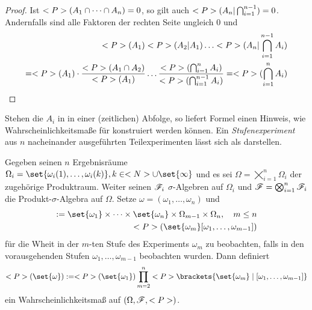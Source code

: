 \begin{proof}
	Ist $<P>(A_1 \cap \dots \cap A_n) = 0$, so gilt auch $<P>(A_n \vert \bigcap_{i=1}^{n-1}) = 0$. Andernfalls sind alle Faktoren der rechten Seite ungleich 0 und
	\begin{align*}
		\probp(A_1)\probp(A_2 \vert A_1) \dots \probp(A_n \vert \bigcap_{i=1}^{n-1} A_i) \\
		= \probp(A_1) \cdot \frac{\probp(A_1 \cap A_2)}{\probp(A_1)} \dots \frac{\probp(\bigcap_{i=1}^{n} A_i)}{\probp(\bigcap_{i=1}^{n-1}A_i)} = \probp(\bigcap_{i=1}^n A_i)	
	\end{align*}
\end{proof} %
Stehen die $A_i$ in  in einer (zeitlichen) Abfolge, so liefert Formel einen Hinweis, wie Wahrscheinlichkeitsmaße für  konstruiert werden können. Ein \emph{Stufenexperiment} aus $n$ nacheinander ausgeführten Teilexperimenten lässt sich als  darstellen.


\begin{proposition}
	Gegeben seinen $n$ Ergebnisräume $\Omega_i = \set{\omega_i (1), \dots, \omega_i (k)}, k \in \N \cup \set{\infty}$ und es sei $\Omega = \bigtimes_{i = 1}^n \Omega_i$ der zugehörige Produktraum. Weiter seinen $\mathscr{F}_i$ $\sigma$-Algebren auf $\Omega_i$ und $\mathscr{F} = \bigotimes_{i=1}^n \mathscr{F}_i$ die Produkt-$\sigma$-Algebra auf $\Omega$. Setze $\omega = (\omega_1,\dots,\omega_n)$ und
	\begin{align*}
		[\omega_1,\dots,\omega_n]:= \set{\omega_1}\times \dots \times \set{\omega_n} \times \Omega_{m-1} \times \Omega_{n},\quad m\le n\\
		\probp(\set{\omega_m}[\omega_1,\dots,\omega_{m-1}])
	\end{align*} %
	für die Wheit in der $m$-ten Stufe des Experiments $\omega_m$ zu beobachten, falls in den vorausgehenden Stufen $\omega_1,\dots,\omega_{m-1}$ beobachten wurden. Dann definiert
	\begin{align*}
		\probp(\set{\omega}) := \probp(\set{\omega_1})\prod_{m=2}^{n}\probp\brackets{\set{\omega_m} \mid [\omega_1, \dots, \omega_{m-1}]}
	\end{align*}
	ein Wahrscheinlichkeitsmaß auf $(\Omega, \mathscr{F}, <P>)$.
\end{proposition}

